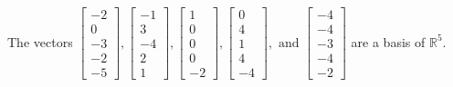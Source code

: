 \begin{exercise}
\begin{exerciseStatement}
  \end{exerciseStatement}
  \begin{exerciseAnswer}
   The vectors \(\left[\begin{array}{r}
-2 \\
0 \\
-3 \\
-2 \\
-5
\end{array}\right] , \left[\begin{array}{r}
-1 \\
3 \\
-4 \\
2 \\
1
\end{array}\right] , \left[\begin{array}{r}
1 \\
0 \\
0 \\
0 \\
-2
\end{array}\right] , \left[\begin{array}{r}
0 \\
4 \\
1 \\
4 \\
-4
\end{array}\right] , \text{ and } \left[\begin{array}{r}
-4 \\
-4 \\
-3 \\
-4 \\
-2
\end{array}\right]\) 
  	 are  a basis of \(\mathbb{R}^5\).
  


  \end{exerciseAnswer}
\end{exercise}